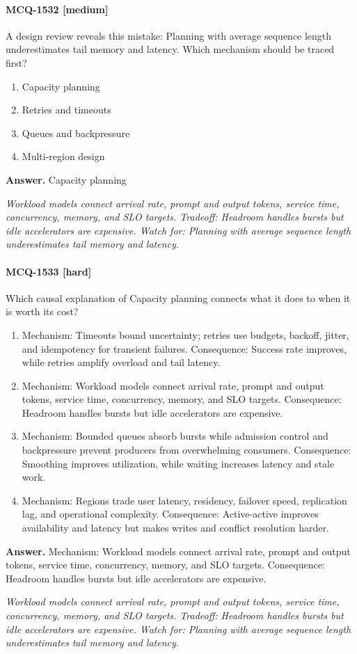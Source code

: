 \paragraph{MCQ-1532 [medium]} A design review reveals this mistake: Planning with average sequence length underestimates tail memory and latency. Which mechanism should be traced first?
\begin{enumerate}[label=\Alph*.]
\item Capacity planning
\item Retries and timeouts
\item Queues and backpressure
\item Multi-region design
\end{enumerate}
\noindent\textbf{Answer.} Capacity planning
\par\textit{Workload models connect arrival rate, prompt and output tokens, service time, concurrency, memory, and SLO targets. Tradeoff: Headroom handles bursts but idle accelerators are expensive. Watch for: Planning with average sequence length underestimates tail memory and latency.}
\paragraph{MCQ-1533 [hard]} Which causal explanation of Capacity planning connects what it does to when it is worth its cost?
\begin{enumerate}[label=\Alph*.]
\item Mechanism: Timeouts bound uncertainty; retries use budgets, backoff, jitter, and idempotency for transient failures. Consequence: Success rate improves, while retries amplify overload and tail latency.
\item Mechanism: Workload models connect arrival rate, prompt and output tokens, service time, concurrency, memory, and SLO targets. Consequence: Headroom handles bursts but idle accelerators are expensive.
\item Mechanism: Bounded queues absorb bursts while admission control and backpressure prevent producers from overwhelming consumers. Consequence: Smoothing improves utilization, while waiting increases latency and stale work.
\item Mechanism: Regions trade user latency, residency, failover speed, replication lag, and operational complexity. Consequence: Active-active improves availability and latency but makes writes and conflict resolution harder.
\end{enumerate}
\noindent\textbf{Answer.} Mechanism: Workload models connect arrival rate, prompt and output tokens, service time, concurrency, memory, and SLO targets. Consequence: Headroom handles bursts but idle accelerators are expensive.
\par\textit{Workload models connect arrival rate, prompt and output tokens, service time, concurrency, memory, and SLO targets. Tradeoff: Headroom handles bursts but idle accelerators are expensive. Watch for: Planning with average sequence length underestimates tail memory and latency.}
